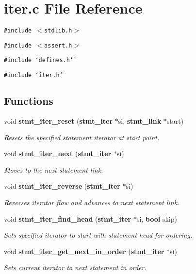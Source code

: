 \section{iter.c File Reference}
\label{iter_8c}
{\tt \#include $<$stdlib.h$>$}\par
{\tt \#include $<$assert.h$>$}\par
{\tt \#include \char`\"{}defines.h\char`\"{}}\par
{\tt \#include \char`\"{}iter.h\char`\"{}}\par
\subsection*{Functions}
\begin{CompactItemize}
\item 
void {\bf stmt\_\-iter\_\-reset} ({\bf stmt\_\-iter} $\ast$si, {\bf stmt\_\-link} $\ast$start)
\begin{CompactList}\small\item\em Resets the specified statement iterator at start point.\item\end{CompactList}\item 
void {\bf stmt\_\-iter\_\-next} ({\bf stmt\_\-iter} $\ast$si)
\begin{CompactList}\small\item\em Moves to the next statement link.\item\end{CompactList}\item 
void {\bf stmt\_\-iter\_\-reverse} ({\bf stmt\_\-iter} $\ast$si)
\begin{CompactList}\small\item\em Reverses iterator flow and advances to next statement link.\item\end{CompactList}\item 
void {\bf stmt\_\-iter\_\-find\_\-head} ({\bf stmt\_\-iter} $\ast$si, {\bf bool} skip)
\begin{CompactList}\small\item\em Sets specified iterator to start with statement head for ordering.\item\end{CompactList}\item 
void {\bf stmt\_\-iter\_\-get\_\-next\_\-in\_\-order} ({\bf stmt\_\-iter} $\ast$si)
\begin{CompactList}\small\item\em Sets current iterator to next statement in order.\item\end{CompactList}\end{CompactItemize}


